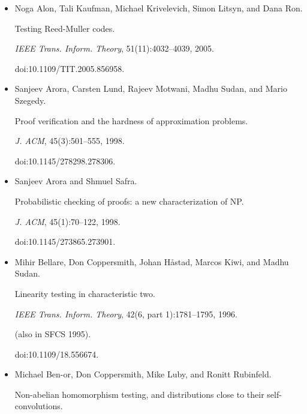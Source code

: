 \documentclass[10pt,a4paper]{article}
\begin{document}
\begin{itemize}


\item[] 
[1]

Noga Alon, Tali Kaufman, Michael Krivelevich, Simon Litsyn, and Dana Ron.


Testing Reed-Muller codes.


\emph{IEEE Trans. Inform. Theory}, 51(11):4032–4039, 2005.


doi:10.1109/TIT.2005.856958.





\item[] 
[2]

Sanjeev Arora, Carsten Lund, Rajeev Motwani, Madhu Sudan, and Mario Szegedy.


Proof verification and the hardness of approximation problems.


\emph{J. ACM}, 45(3):501–555, 1998.


doi:10.1145/278298.278306.





\item[] 
[3]

Sanjeev Arora and Shmuel Safra.


Probabilistic checking of proofs: a new characterization of NP.


\emph{J. ACM}, 45(1):70–122, 1998.


doi:10.1145/273865.273901.





\item[] 
[4]

Mihir Bellare, Don Coppersmith, Johan Håstad, Marcos Kiwi, and Madhu Sudan.


Linearity testing in characteristic two.


\emph{IEEE Trans. Inform. Theory}, 42(6, part 1):1781–1795, 1996.


(also in SFCS 1995).


doi:10.1109/18.556674.





\item[] 
[5]

Michael Ben-or, Don Coppersmith, Mike Luby, and Ronitt Rubinfeld.


Non-abelian homomorphism testing, and distributions close to their
self-convolutions.



\end{itemize}
\end{document}
